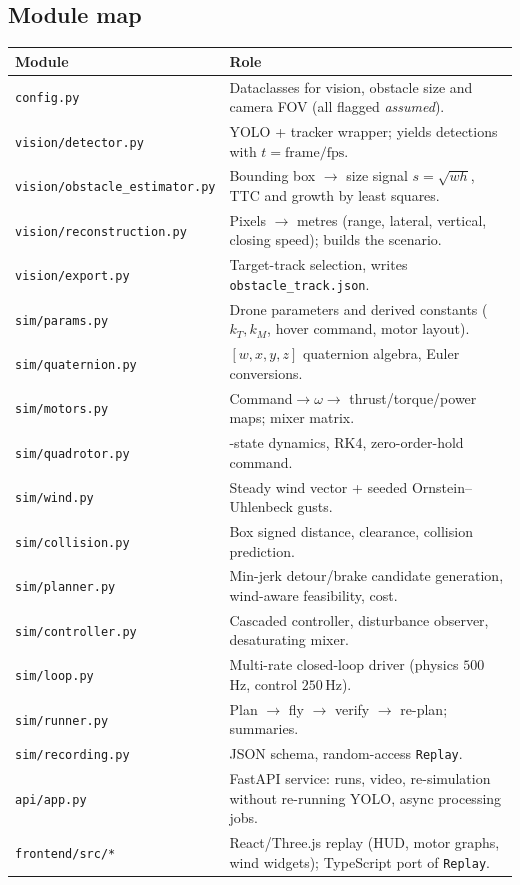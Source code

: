\documentclass[11pt,a4paper]{article}
\newcommand{\code}[1]{\texttt{\small #1}}
\begin{document}
\subsection{Module map}
\begin{center}
\small
\begin{tabularx}{\textwidth}{@{}l>{\raggedright\arraybackslash}X@{}}
\toprule
Module & Role \\ \midrule
\code{config.py} & Dataclasses for vision, obstacle size and camera FOV (all flagged \emph{assumed}). \\
\code{vision/detector.py} & YOLO + tracker wrapper; yields detections with $t=\text{frame}/\text{fps}$. \\
\code{vision/obstacle\_estimator.py} & Bounding box $\to$ size signal $s=\sqrt{wh}$, TTC and growth by least squares. \\
\code{vision/reconstruction.py} & Pixels $\to$ metres (range, lateral, vertical, closing speed); builds the scenario. \\
\code{vision/export.py} & Target-track selection, writes \code{obstacle\_track.json}. \\
\code{sim/params.py} & Drone parameters and derived constants ($k_T,k_M$, hover command, motor layout). \\
\code{sim/quaternion.py} & $[w,x,y,z]$ quaternion algebra, Euler conversions. \\
\code{sim/motors.py} & Command$\to\omega\to$ thrust/torque/power maps; mixer matrix. \\
\code{sim/quadrotor.py} & 17-state dynamics, RK4, zero-order-hold command. \\
\code{sim/wind.py} & Steady wind vector + seeded Ornstein--Uhlenbeck gusts. \\
\code{sim/collision.py} & Box signed distance, clearance, collision prediction. \\
\code{sim/planner.py} & Min-jerk detour/brake candidate generation, wind-aware feasibility, cost. \\
\code{sim/controller.py} & Cascaded controller, disturbance observer, desaturating mixer. \\
\code{sim/loop.py} & Multi-rate closed-loop driver (physics $500$\,Hz, control $250$\,Hz). \\
\code{sim/runner.py} & Plan $\to$ fly $\to$ verify $\to$ re-plan; summaries. \\
\code{sim/recording.py} & JSON schema, random-access \code{Replay}. \\
\code{api/app.py} & FastAPI service: runs, video, re-simulation without re-running YOLO, async processing jobs. \\
\code{frontend/src/*} & React/Three.js replay (HUD, motor graphs, wind widgets); TypeScript port of \code{Replay}. \\
\bottomrule
\end{tabularx}
\end{center}
\end{document}
